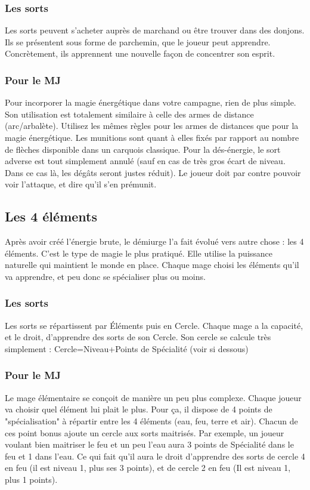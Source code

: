 \subsubsection{Les sorts}
Les sorts peuvent s'acheter auprès de marchand ou être trouver dans des donjons. Ils se présentent sous forme de parchemin, que le joueur peut apprendre. Concrètement, ils apprennent une nouvelle façon de concentrer son esprit.
\subsubsection{Pour le MJ}
Pour incorporer la magie énergétique dans votre campagne, rien de plus simple. Son utilisation est totalement similaire à celle des armes de distance (arc/arbalète). Utilisez les mêmes règles pour les armes de distances que pour la magie énergétique. Les munitions sont quant à elles fixés par rapport au nombre de flèches disponible dans un carquois classique. 
Pour la dés-énergie, le sort adverse est tout simplement annulé (sauf en cas de très gros écart de niveau. Dans ce cas là, les dégâts seront justes réduit). Le joueur doit par contre pouvoir voir l'attaque, et dire qu'il s'en prémunit.
\subsection{Les 4 éléments}
Après avoir créé l'énergie brute, le démiurge l'a fait évolué vers autre chose : les 4 éléments. C'est le type de magie le plus pratiqué. Elle utilise la puissance naturelle qui maintient le monde en place. Chaque mage choisi les éléments qu'il va apprendre, et peu donc se spécialiser plus ou moins.
\subsubsection{Les sorts}
Les sorts se répartissent par Éléments puis en Cercle. Chaque mage a la capacité, et le droit, d'apprendre des sorts de son Cercle. Son cercle se calcule très simplement : Cercle=Niveau+Points de Spécialité (voir si dessous)
\subsubsection{Pour le MJ}
Le mage élémentaire se conçoit de manière un peu plus complexe. Chaque joueur va choisir quel élément lui plait le plus. Pour ça, il dispose de 4 points de "spécialisation" à répartir entre les 4 éléments (eau, feu, terre et air). Chacun de ces point bonus ajoute un cercle aux sorts maitrisés. 
Par exemple, un joueur voulant bien maitriser le feu et un peu l'eau aura 3 points de Spécialité dans le feu et 1 dans l'eau. Ce qui fait qu'il aura le droit d'apprendre des sorts de cercle 4 en feu (il est niveau 1, plus ses 3 points), et de cercle 2 en feu (Il est niveau 1, plus 1 points).
